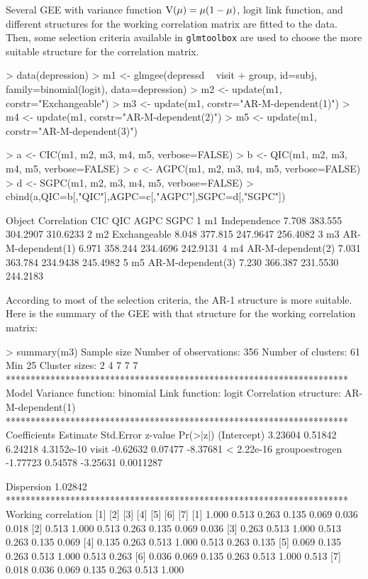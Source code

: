 Several GEE with variance function ${\rm V}(\mu)=\mu(1-\mu)$, logit link function, and different structures for the working correlation matrix are fitted to the data. Then, some selection criteria available in {\tt glmtoolbox} are used to choose the more suitable structure for the correlation matrix.

\begin{example}
> data(depression)
> m1 <- glmgee(depressd ~ visit + group, id=subj, family=binomial(logit), data=depression)
> m2 <- update(m1, corstr="Exchangeable")
> m3 <- update(m1, corstr="AR-M-dependent(1)")
> m4 <- update(m1, corstr="AR-M-dependent(2)")
> m5 <- update(m1, corstr="AR-M-dependent(3)")

> a <- CIC(m1, m2, m3, m4, m5, verbose=FALSE)
> b <- QIC(m1, m2, m3, m4, m5, verbose=FALSE)
> c <- AGPC(m1, m2, m3, m4, m5, verbose=FALSE)
> d <- SGPC(m1, m2, m3, m4, m5, verbose=FALSE)
> cbind(a,QIC=b[,"QIC"],AGPC=c[,"AGPC"],SGPC=d[,"SGPC"])

  Object       Correlation  CIC    QIC     AGPC     SGPC
1     m1      Independence 7.708 383.555 304.2907 310.6233
2     m2      Exchangeable 8.048 377.815 247.9647 256.4082
3     m3 AR-M-dependent(1) 6.971 358.244 234.4696 242.9131
4     m4 AR-M-dependent(2) 7.031 363.784 234.9438 245.4982
5     m5 AR-M-dependent(3) 7.230 366.387 231.5530 244.2183
\end{example}

According to most of the selection criteria, the AR-1 structure is more suitable. Here is the summary of the GEE with that structure for the working correlation matrix:

\begin{example}
> summary(m3)
Sample size
   Number of observations:  356
       Number of clusters:  61 
                            Min  25%
            Cluster sizes:    2    4    7    7    7
*********************************************************************
Model
        Variance function:  binomial
            Link function:  logit
    Correlation structure:  AR-M-dependent(1)
*********************************************************************
Coefficients
                Estimate Std.Error  z-value   Pr(>|z|)
(Intercept)     3.23604   0.51842  6.24218 4.3152e-10
visit          -0.62632   0.07477 -8.37681 < 2.22e-16
groupoestrogen -1.77723   0.54578 -3.25631  0.0011287
                                                    
Dispersion     1.02842                              
*********************************************************************
Working correlation
     [1]   [2]   [3]   [4]   [5]   [6]   [7] 
[1] 1.000 0.513 0.263 0.135 0.069 0.036 0.018
[2] 0.513 1.000 0.513 0.263 0.135 0.069 0.036
[3] 0.263 0.513 1.000 0.513 0.263 0.135 0.069
[4] 0.135 0.263 0.513 1.000 0.513 0.263 0.135
[5] 0.069 0.135 0.263 0.513 1.000 0.513 0.263
[6] 0.036 0.069 0.135 0.263 0.513 1.000 0.513
[7] 0.018 0.036 0.069 0.135 0.263 0.513 1.000
\end{example}

